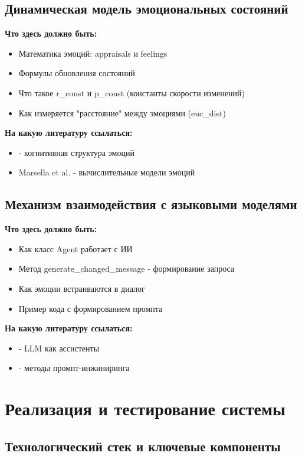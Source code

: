 \documentclass[a4paper,14pt]{extarticle}
\begin{document}
\subsection{Динамическая модель эмоциональных состояний}

\textbf{Что здесь должно быть:}
\begin{itemize}
\item Математика эмоций: appraisals и feelings
\item Формулы обновления состояний
\item Что такое r\_const и p\_const (константы скорости изменений)
\item Как измеряется "расстояние" между эмоциями (euc\_dist)
\end{itemize}

\textbf{На какую литературу ссылаться:}
\begin{itemize}
\item \cite{11} - когнитивная структура эмоций
\item Marsella et al. - вычислительные модели эмоций
\end{itemize}

\subsection{Механизм взаимодействия с языковыми моделями}

\textbf{Что здесь должно быть:}
\begin{itemize}
\item Как класс Agent работает с ИИ
\item Метод generate\_changed\_message - формирование запроса
\item Как эмоции встраиваются в диалог
\item Пример кода с формированием промпта
\end{itemize}

\textbf{На какую литературу ссылаться:}
\begin{itemize}
\item \cite{5} - LLM как ассистенты
\item \cite{12} - методы промпт-инжиниринга
\end{itemize}

\section{Реализация и тестирование системы}

\subsection{Технологический стек и ключевые компоненты}
\end{document}
